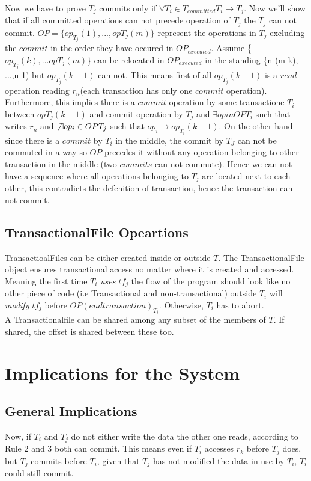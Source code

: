 \documentclass[a4paper, 11pt]{article}
\begin{document}
Now we have to prove $T_j$ commits only if $\forall T_i \in T_{committed} T_i \rightarrow T_j$. Now we'll show that if all committed operations can not precede operation of $T_j$ the $T_j$ can not commit. $OP = \{op_{T_j}(1), ..., op{T_j}(m)\}$ represent the operations in $T_j$ excluding the ${commit}$ in the order they have occured in $OP_{executed}$. Assume \{$op_{T_j}(k),...op{T_j}(m)$\} can be relocated in $OP_{executed}$ in the standing \{n-(m-k), ...,n-1) but $op_{T_j}(k-1)$ can not. This means first of all $op_{T_j}(k-1)$ is a ${read}$ operation reading $r_n$(each transaction has only one ${commit}$ operation). Furthermore, this implies there is a ${commit}$ operation by some transactione $T_i$ between $op{T_j}(k-1)$ and commit operation by $T_j$ and $ \exists op in OP{T_i}$ such that writes $r_n$ and $\not \exists op_i \in OP{T_j}$ such that $op_i \rightarrow op_{T_i}(k-1)$. On the other hand since there is a ${commit}$ by $T_i$ in the middle, the commit by $T_J$ can not be commuted in a way so $OP$ precedes it without any operation belonging to other transaction in the middle (two ${commits}$ can not commute). Hence we can not have a sequence where all operations belonging to $T_j$ are located next to each other, this contradicts the defenition of transaction, hence the transaction can not commit.  


\subsection{TransactionalFile Opeartions}
TransactioalFiles can be either created inside or outside $T$. The TransactionalFile object ensures transactional access no matter where it is created and accessed. Meaning the first time $T_i$ \emph {uses} $tf_j$ the flow of the program should look like no other piece of code (i.e Transactional and non-transactional) outside $T_i$ will \emph {modify} $tf_j$ before $OP(endtransaction)_{T_i}$. Otherwise, $T_i$ has to abort. \\


A Transactionalfile can be shared among any subset of the members of $T$. If shared, the offset is shared between these too. 

\section{Implications for the System}

\subsection{General Implications}
Now, if $T_i$ and $T_j$ do not either write the data the other one reads, according to Rule 2 and 3 both can commit. This means even if $T_i$ accesses $r_k$ before $T_j$ does, but $T_j$ commits before $T_i$, given that $T_j$ has not modified the data in use by $T_i$, $T_i$ could still commit. \\
\end{document}
